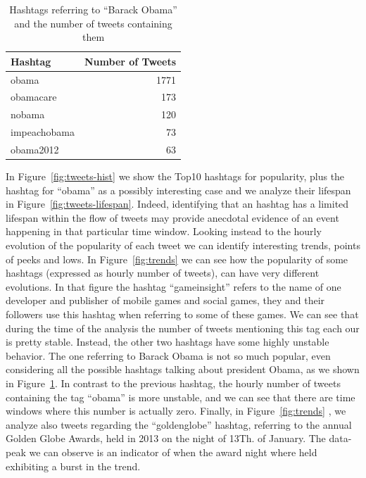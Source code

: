 \begin{table}[htb]
\centering 
\begin{tabular}{|l|r|}
\hline		
Hashtag			& Number of Tweets\\
\hline
obama		&	1771\\
obamacare		& 173\\
nobama 		& 120\\
impeachobama 		& 73\\  
obama2012 		& 63\\  
\hline
\end{tabular}
\caption{Hashtags referring to ``Barack Obama'' and the number of tweets containing them}
\label{tbl:obama-tweets}
\end{table}

In Figure~\ref{fig:tweets-hist} we show the Top10 hashtags for popularity, plus the hashtag for ``obama'' as a possibly interesting case  and we analyze their lifespan in Figure~\ref{fig:tweets-lifespan}.
Indeed, identifying that an hashtag has a limited lifespan within the flow of tweets may provide anecdotal evidence of an event happening in that  particular time window.
Looking instead to the hourly evolution of the popularity of each tweet we can identify interesting trends, points of peeks and lows.
In Figure~\ref{fig:trends} we can see how the popularity of some hashtags (expressed as hourly number of tweets), can have very different evolutions.
In that figure the hashtag ``gameinsight'' refers to the name of one developer and publisher of mobile games and social games, they and their followers use this hashtag when referring to some of these games.
We can see that during the time of the analysis the number of tweets mentioning this tag each our is pretty stable.
Instead, the other two hashtags have some highly unstable behavior.
The one referring to Barack Obama is not so much popular, even considering all the possible hashtags talking about president Obama, as we shown in Figure~\ref{tbl:obama-tweets}.
In contrast to the previous hashtag, the hourly number of tweets containing the tag ``obama'' is more unstable, and we can see that there are time windows where this number is actually zero.
Finally, in Figure~\ref{fig:trends} , we analyze also tweets regarding the ``goldenglobe'' hashtag, referring to the annual Golden Globe Awards, held in 2013 on the night of 13Th. of January.
The data-peak we can observe is an indicator of when the award night where held exhibiting a burst in the trend.

